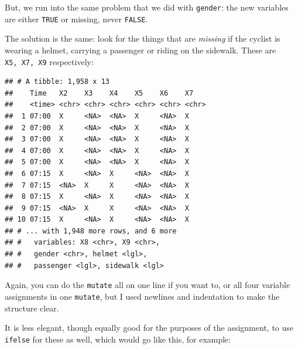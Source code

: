 \documentclass[]{tufte-book}
\newenvironment{Shaded}{}{}
\newcommand{\DataTypeTok}[1]{\textcolor[rgb]{0.56,0.13,0.00}{#1}}
\newcommand{\KeywordTok}[1]{\textcolor[rgb]{0.00,0.44,0.13}{\textbf{#1}}}
\newcommand{\NormalTok}[1]{#1}
\newcommand{\OperatorTok}[1]{\textcolor[rgb]{0.40,0.40,0.40}{#1}}
\newcommand{\StringTok}[1]{\textcolor[rgb]{0.25,0.44,0.63}{#1}}
\theoremstyle{definition}
\theoremstyle{definition}
\theoremstyle{definition}
\theoremstyle{remark}
\begin{document}
But, we run into the same problem that we did with \texttt{gender}: the
new variables are either \texttt{TRUE} or missing, never \texttt{FALSE}.

The solution is the same: look for the things that are \emph{missing} if
the cyclist is wearing a helmet, carrying a passenger or riding on the
sidewalk. These are \texttt{X5,\ X7,\ X9} respectively:

\begin{Shaded}
\end{Shaded}

\begin{verbatim}
## # A tibble: 1,958 x 13
##    Time   X2    X3    X4    X5    X6    X7   
##    <time> <chr> <chr> <chr> <chr> <chr> <chr>
##  1 07:00  X     <NA>  <NA>  X     <NA>  X    
##  2 07:00  X     <NA>  <NA>  X     <NA>  X    
##  3 07:00  X     <NA>  <NA>  X     <NA>  X    
##  4 07:00  X     <NA>  <NA>  X     <NA>  X    
##  5 07:00  X     <NA>  <NA>  X     <NA>  X    
##  6 07:15  X     <NA>  X     <NA>  <NA>  X    
##  7 07:15  <NA>  X     X     <NA>  <NA>  X    
##  8 07:15  X     <NA>  X     <NA>  <NA>  X    
##  9 07:15  <NA>  X     X     <NA>  <NA>  X    
## 10 07:15  X     <NA>  X     <NA>  <NA>  X    
## # ... with 1,948 more rows, and 6 more
## #   variables: X8 <chr>, X9 <chr>,
## #   gender <chr>, helmet <lgl>,
## #   passenger <lgl>, sidewalk <lgl>
\end{verbatim}

Again, you can do the \texttt{mutate} all on one line if you want to, or
all four variable assignments in one \texttt{mutate}, but I used
newlines and indentation to make the structure clear.

It is less elegant, though equally good for the purposes of the
assignment, to use \texttt{ifelse} for these as well, which would go
like this, for example:
\end{document}
